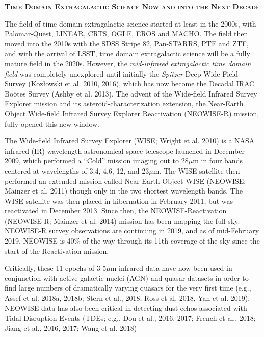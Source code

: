 \documentclass[12pt]{article}
\begin{document}
\pagebreak
\smallskip
\smallskip
\noindent
{\bfseries \textsc{\textcolor{Cerulean}{Time Domain Extragalactic Science Now and into the Next Decade}}}

\smallskip
\smallskip 
\noindent
The field of time domain extragalactic science started at least in the 2000s, with Palomar-Quest, LINEAR, CRTS, OGLE, EROS and MACHO. The field then moved into the 2010s with the SDSS Stripe 82, Pan-STARRS, PTF and ZTF, and with the arrival of LSST, time domain extragalactic science will be a fully mature field in the 2020s. However, the {\it mid-infrared extragalactic time domain field} was completely unexplored until initially the {\it Spitzer} Deep Wide-Field Survey (Koz{\l}owski et al. 2010, 2016), which has now become the Decadal IRAC Bo\"{o}tes Survey (Ashby et al. 2013). The advent of the Wide-field Infrared Survey Explorer mission and its asteroid-characterization extension, the Near-Earth Object Wide-field Infrared Survey Explorer Reactivation (NEOWISE-R) mission, fully opened this new window.

\smallskip 
\smallskip 
\noindent
The Wide-field Infrared Survey Explorer (WISE; Wright et al. 2010) is
a NASA infrared (IR) wavelength astronomical space telescope launched
in December 2009, which performed a ``Cold'' mission imaging out to
28$\mu$m in four bands centered at wavelengths of 3.4, 4.6, 12, and
23$\mu$m. The WISE satellite then performed an extended mission called
Near-Earth Object WISE (NEOWISE; Mainzer et al. 2011) though only in
the two shortest wavelength bands. The WISE satellite was then placed in
hibernation in February 2011, but was reactivated in December 2013.
Since then, the NEOWISE-Reactivation (NEOWISE-R; Mainzer et al. 2014)
mission has been mapping the full sky. NEOWISE-R survey observations
are continuing in 2019, and as of mid-February 2019, NEOWISE is 40\%
of the way through its 11th coverage of the sky since the start of the
Reactivation mission.

\smallskip
\smallskip 
\noindent
Critically, these 11 epochs of 3-5$\mu$m infrared data have now been
used in conjunction with active galactic nuclei (AGN) and quasar
datasets in order to find large numbers of dramatically varying
quasars for the very first time (e.g., Assef et al. 2018a, 2018b; Stern
et al., 2018; Ross et al. 2018, Yan et al. 2019). NEOWISE data has
also been critical in detecting dust echos associated with Tidal
Disruption Events (TDEs; e.g., Dou et al., 2016, 2017; French et al., 2018;
Jiang et al., 2016, 2017; Wang et al. 2018)
\end{document}
